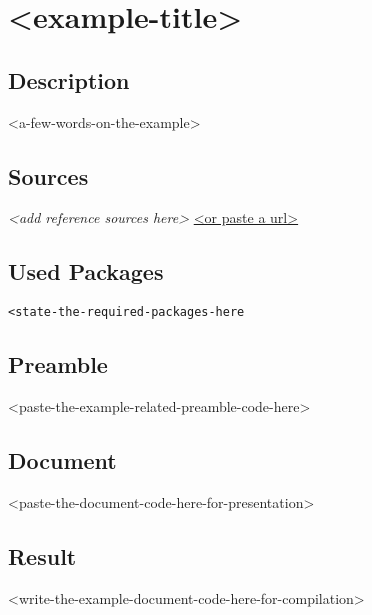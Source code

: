 \documentclass{article}
\begin{document}
\section*{<example-title>}

\subsection*{Description}
<a-few-words-on-the-example>

\subsection*{Sources}
\textit{<add reference sources here>}
\url{<or paste a url>}

\subsection*{Used Packages}
\verb|<state-the-required-packages-here|

\subsection*{Preamble}
\begin{latex}
	<paste-the-example-related-preamble-code-here>
\end{latex}

\subsection*{Document}
\begin{latex}
	<paste-the-document-code-here-for-presentation>
\end{latex}

\subsection*{Result}
<write-the-example-document-code-here-for-compilation>
\end{document}

